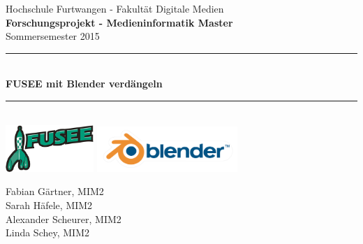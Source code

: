 \begin{titlepage}

\newcommand{\HRule}{\rule{\linewidth}{0.5mm}} %

\center %
 

\Large Hochschule Furtwangen - Fakultät Digitale Medien\\[0.5cm] %
{\Large \bfseries Forschungsprojekt - Medieninformatik Master}\\[0.5cm] %
\large Sommersemester 2015\\[0.5cm] %


\HRule \\[0.2cm]
{ \huge \bfseries FUSEE mit Blender verdängeln}\\[0cm] %
\HRule \\[0.7cm]
 
\includegraphics[width=0.25\textwidth]{images/FuseeLogo375}
\includegraphics[width=0.4\textwidth]{images/blender_logo}\\[1cm]


\begin{minipage}{0.55\textwidth}
\begin{flushleft} \large
Fabian Gärtner, MIM2\\
Sarah Häfele, MIM2\\
Alexander Scheurer, MIM2\\
Linda Schey, MIM2\\


\end{flushleft}
\end{minipage}
\end{titlepage}
